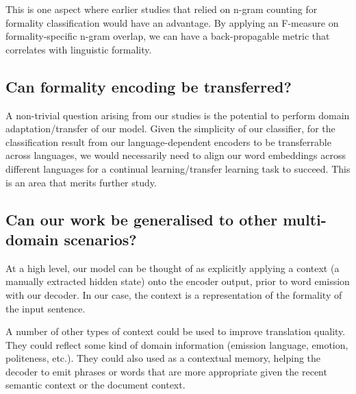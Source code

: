 \documentclass[11pt]{article}
\begin{document}
This is one aspect where earlier studies that relied on n-gram counting for formality classification would have an advantage. By applying an F-measure on formality-specific n-gram overlap, we can have a back-propagable metric that correlates with linguistic formality.

\subsection{Can formality encoding be transferred?}

A non-trivial question arising from our studies is the potential to perform domain adaptation/transfer of our model. Given the simplicity of our classifier, for the classification result from our language-dependent encoders to be transferrable across languages, we would necessarily need to align our word embeddings across different languages for a continual learning/transfer learning task to succeed. This is an area that merits further study.

\subsection{Can our work be generalised to other multi-domain scenarios?}

At a high level, our model can be thought of as explicitly applying a context (a manually extracted hidden state) onto the encoder output, prior to word emission with our decoder. In our case, the context is a representation of the formality of the input sentence.

A number of other types of context could be used to improve translation quality. They could reflect some kind of domain information (emission language, emotion, politeness, etc.). They could also used as a contextual memory, helping the decoder to emit phrases or words that are more appropriate given the recent semantic context or the document context.

\newpage
\printbibliography
\end{document}

